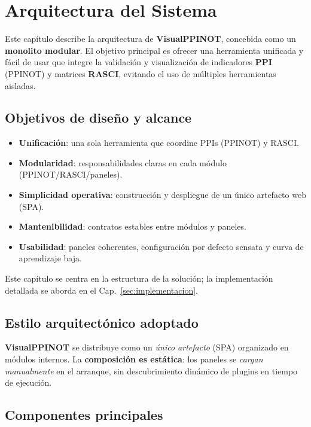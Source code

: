 \chapter{Arquitectura del Sistema}
\label{sec:arquitectura}

Este capítulo describe la arquitectura de \textbf{VisualPPINOT}, concebida como un \textbf{monolito modular}. El objetivo principal es ofrecer una herramienta unificada y fácil de usar que integre la validación y visualización de indicadores \textbf{PPI} (PPINOT) y matrices \textbf{RASCI}, evitando el uso de múltiples herramientas aisladas.

\section{Objetivos de diseño y alcance}
\label{subsec:objetivos}
\begin{itemize}
  \item \textbf{Unificación}: una sola herramienta que coordine PPIs (PPINOT) y RASCI.
  \item \textbf{Modularidad}: responsabilidades claras en cada módulo (PPINOT/RASCI/paneles).
  \item \textbf{Simplicidad operativa}: construcción y despliegue de un único artefacto web (SPA).
  \item \textbf{Mantenibilidad}: contratos estables entre módulos y paneles.
  \item \textbf{Usabilidad}: paneles coherentes, configuración por defecto sensata y curva de aprendizaje baja.
\end{itemize}

Este capítulo se centra en la estructura de la solución; la implementación detallada se aborda en el Cap.~\ref{sec:implementacion}.

\section{Estilo arquitectónico adoptado}
\label{subsec:monolito}
\textbf{VisualPPINOT} se distribuye como un \emph{único artefacto} (SPA) organizado en módulos internos. La \textbf{composición es estática}: los paneles se \emph{cargan manualmente} en el arranque, sin descubrimiento dinámico de plugins en tiempo de ejecución.  

\section{Componentes principales}
\label{subsec:componentes}

